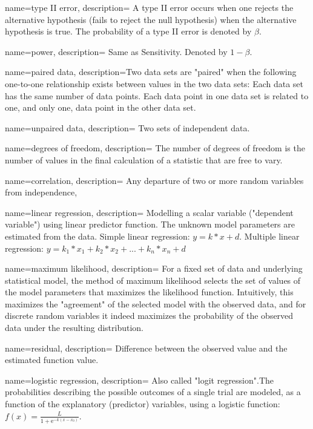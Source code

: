 {
    name=type II error,
    description={ A type II error occurs when one rejects the alternative hypothesis (fails
    to reject the null hypothesis) when the alternative hypothesis is true.
    The probability of a type II error is denoted by $\beta$.}
}

{
    name=power,
    description={ Same as Sensitivity. Denoted by $1-\beta$.}
}

{
    name=paired data,
    description={Two data sets are "paired" when the following one-to-one
    relationship exists between values in the two data sets:
        Each data set has the same number of data points.
        Each data point in one data set is related to one, and only one, data
        point in the other data set.}
}

{
    name=unpaired data,
    description={ Two sets of independent data.}
}

{
    name=degrees of freedom,
    description={ The number of degrees of freedom is the number of values in the final
    calculation of a statistic that are free to vary.}
}

{
    name=correlation,
    description={ Any departure of two or more random variables from
    independence,}
}

{
    name=linear regression,
    description={ Modelling a scalar variable ("dependent variable") using linear predictor
    function. The unknown model parameters are estimated from the data.
    Simple linear regression: $y = k*x + d$.
    Multiple linear regression: $y = k_1*x_1 + k_2*x_2 + ... + k_n*x_n + d$}
}

{
    name=maximum likelihood,
    description={ For a fixed set of data and underlying statistical model, the
    method of maximum likelihood selects the set of values of the model
    parameters that maximizes the likelihood function. Intuitively, this
    maximizes the "agreement" of the selected model with the observed data,
    and for discrete random variables it indeed maximizes the probability of
    the observed data under the resulting distribution. }
}

{
    name=residual,
    description={ Difference between the observed value and the estimated
    function value.}
}

{
    name=logistic regression,
    description={ Also called "logit regression".The probabilities describing the possible
    outcomes of a single trial are modeled, as a function of the explanatory
    (predictor) variables, using a logistic function: $f(x) = \frac{L}{1 +
    \mathrm e^{-k(x-x_0)}}$.}
}


